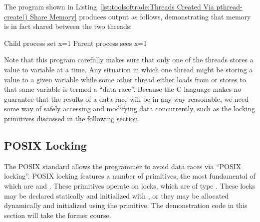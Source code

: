 The program shown in
Listing~\ref{lst:toolsoftrade:Threads Created Via pthread-create() Share Memory}
produces output as follows, demonstrating that memory is in fact
shared between the two threads:

\begin{VerbatimU}
Child process set x=1
Parent process sees x=1
\end{VerbatimU}

Note that this program carefully makes sure that only one of the threads
stores a value to variable  at a time.
Any situation in which one thread might be storing a value to a given
variable while some other thread either loads from or stores to that
same variable is termed a ``data race''.
Because the C language makes no guarantee that the results of a data race
will be in any way reasonable, we need some way of safely accessing
and modifying data concurrently, such as the locking primitives discussed
in the following section.

\QuickQuizEnd

\subsection{POSIX Locking}
\label{sec:toolsoftrade:POSIX Locking}

The POSIX standard allows the programmer to avoid data races via
``POSIX locking''.
POSIX locking features a number of primitives, the most fundamental
of which are  and .
These primitives operate on locks, which are of type .
These locks may be declared statically and initialized with
, or they may be allocated dynamically
and initialized using the  primitive.
The demonstration code in this section will take the former course.

